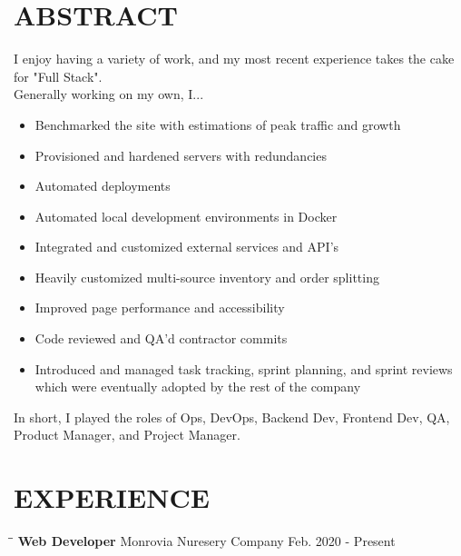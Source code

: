 \documentclass{res}
\begin{document}
\begin{resume}


\section{ABSTRACT}          
    I enjoy having a variety of work, and my most recent experience takes the cake for "Full Stack". \\
    	Generally working on my own, I...
    	\begin{itemize}
    		\item Benchmarked the site with estimations of peak traffic and growth
    	 	\item Provisioned and hardened servers with redundancies
    	 	\item Automated deployments
    	 	\item Automated local development environments in Docker
    	 	\item Integrated and customized external services and API's
    	 	\item Heavily customized multi-source inventory and order splitting
    	 	\item Improved page performance and accessibility
    	 	\item Code reviewed and QA'd contractor commits
    	 	\item Introduced and managed task tracking, sprint planning, and sprint reviews which were eventually adopted by the rest of the company
    	 \end{itemize}
    	 In short, I played the roles of Ops, DevOps, Backend Dev, Frontend Dev, QA, Product Manager, and Project Manager.
    
 
 
\section{EXPERIENCE}
   \vspace{-0.1in}
   
   \begin{tabbing}
   		\hspace{2.0in}\= \hspace{2.7in}\= \kill %
    	\textbf{Web Developer} \>Monrovia Nuresery Company \>Feb. 2020 - Present\\
   \end{tabbing}\vspace{-20pt}      %
   

\end{resume}
\end{document}
